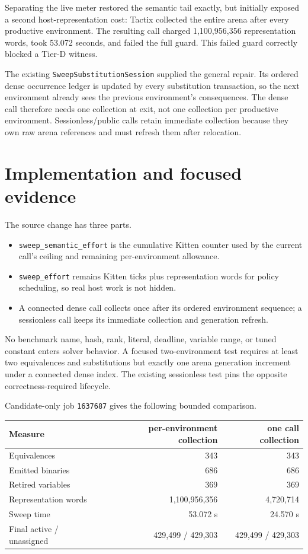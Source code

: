 \documentclass[11pt]{article}
\newcommand{\code}[1]{\texttt{#1}}
\begin{document}
Separating the live meter restored the semantic tail exactly, but initially
exposed a second host-representation cost: Tactix collected the entire arena
after every productive environment.  The resulting call charged
1,100,956,356 representation words, took 53.072 seconds, and failed the full
guard.  This failed guard correctly blocked a Tier-D witness.

The existing \code{SweepSubstitutionSession} supplied the general repair.  Its
ordered dense occurrence ledger is updated by every substitution transaction,
so the next environment already sees the previous environment's consequences.
The dense call therefore needs one collection at exit, not one collection per
productive environment.  Sessionless/public calls retain immediate collection
because they own raw arena references and must refresh them after relocation.

\section*{Implementation and focused evidence}
The source change has three parts.

\begin{itemize}
\item \code{sweep\_semantic\_effort} is the cumulative Kitten counter used by
  the current call's ceiling and remaining per-environment allowance.
\item \code{sweep\_effort} remains Kitten ticks plus representation words for
  policy scheduling, so real host work is not hidden.
\item A connected dense call collects once after its ordered environment
  sequence; a sessionless call keeps its immediate collection and generation
  refresh.
\end{itemize}

No benchmark name, hash, rank, literal, deadline, variable range, or tuned
constant enters solver behavior.  A focused two-environment test requires at
least two equivalences and substitutions but exactly one arena generation
increment under a connected dense index.  The existing sessionless test pins
the opposite correctness-required lifecycle.

Candidate-only job \code{1637687} gives the following bounded comparison.

\begin{center}
\begin{tabular}{lrr}
\toprule
Measure & per-environment collection & one call collection \\
\midrule
Equivalences & 343 & 343 \\
Emitted binaries & 686 & 686 \\
Retired variables & 369 & 369 \\
Representation words & 1,100,956,356 & 4,720,714 \\
Sweep time & 53.072 s & 24.570 s \\
Final active / unassigned & 429,499 / 429,303 & 429,499 / 429,303 \\
\bottomrule
\end{tabular}
\end{center}
\end{document}
